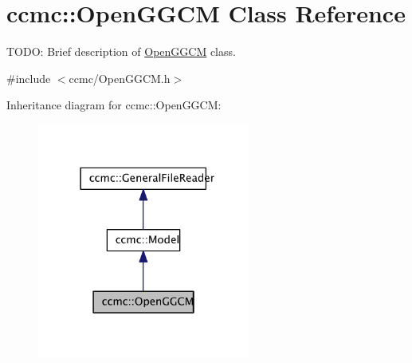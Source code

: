 \hypertarget{classccmc_1_1_open_g_g_c_m}{\section{ccmc\-:\-:Open\-G\-G\-C\-M Class Reference}
\label{classccmc_1_1_open_g_g_c_m}
}


T\-O\-D\-O\-: Brief description of \hyperlink{classccmc_1_1_open_g_g_c_m}{Open\-G\-G\-C\-M} class.  




{\ttfamily \#include $<$ccmc/\-Open\-G\-G\-C\-M.\-h$>$}



Inheritance diagram for ccmc\-:\-:Open\-G\-G\-C\-M\-:\nopagebreak
\begin{figure}[H]
\begin{center}
\leavevmode
\includegraphics[width=198pt]{classccmc_1_1_open_g_g_c_m__inherit__graph}
\end{center}
\end{figure}



